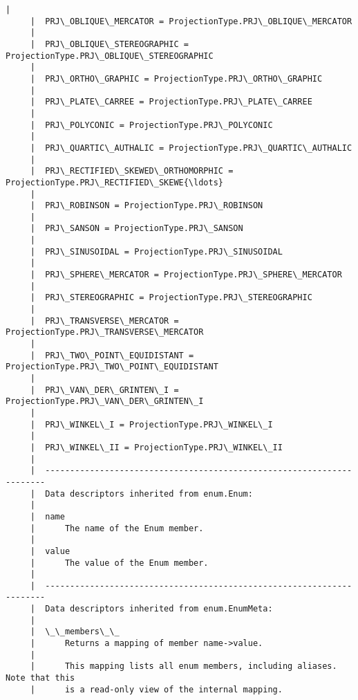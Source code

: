\documentclass[11pt]{article}
\begin{document}
\begin{Verbatim}[commandchars=\\\{\}]
     |  
     |  PRJ\_OBLIQUE\_MERCATOR = ProjectionType.PRJ\_OBLIQUE\_MERCATOR
     |  
     |  PRJ\_OBLIQUE\_STEREOGRAPHIC = ProjectionType.PRJ\_OBLIQUE\_STEREOGRAPHIC
     |  
     |  PRJ\_ORTHO\_GRAPHIC = ProjectionType.PRJ\_ORTHO\_GRAPHIC
     |  
     |  PRJ\_PLATE\_CARREE = ProjectionType.PRJ\_PLATE\_CARREE
     |  
     |  PRJ\_POLYCONIC = ProjectionType.PRJ\_POLYCONIC
     |  
     |  PRJ\_QUARTIC\_AUTHALIC = ProjectionType.PRJ\_QUARTIC\_AUTHALIC
     |  
     |  PRJ\_RECTIFIED\_SKEWED\_ORTHOMORPHIC = ProjectionType.PRJ\_RECTIFIED\_SKEWE{\ldots}
     |  
     |  PRJ\_ROBINSON = ProjectionType.PRJ\_ROBINSON
     |  
     |  PRJ\_SANSON = ProjectionType.PRJ\_SANSON
     |  
     |  PRJ\_SINUSOIDAL = ProjectionType.PRJ\_SINUSOIDAL
     |  
     |  PRJ\_SPHERE\_MERCATOR = ProjectionType.PRJ\_SPHERE\_MERCATOR
     |  
     |  PRJ\_STEREOGRAPHIC = ProjectionType.PRJ\_STEREOGRAPHIC
     |  
     |  PRJ\_TRANSVERSE\_MERCATOR = ProjectionType.PRJ\_TRANSVERSE\_MERCATOR
     |  
     |  PRJ\_TWO\_POINT\_EQUIDISTANT = ProjectionType.PRJ\_TWO\_POINT\_EQUIDISTANT
     |  
     |  PRJ\_VAN\_DER\_GRINTEN\_I = ProjectionType.PRJ\_VAN\_DER\_GRINTEN\_I
     |  
     |  PRJ\_WINKEL\_I = ProjectionType.PRJ\_WINKEL\_I
     |  
     |  PRJ\_WINKEL\_II = ProjectionType.PRJ\_WINKEL\_II
     |  
     |  ----------------------------------------------------------------------
     |  Data descriptors inherited from enum.Enum:
     |  
     |  name
     |      The name of the Enum member.
     |  
     |  value
     |      The value of the Enum member.
     |  
     |  ----------------------------------------------------------------------
     |  Data descriptors inherited from enum.EnumMeta:
     |  
     |  \_\_members\_\_
     |      Returns a mapping of member name->value.
     |      
     |      This mapping lists all enum members, including aliases. Note that this
     |      is a read-only view of the internal mapping.
    

\end{Verbatim}
\end{document}
